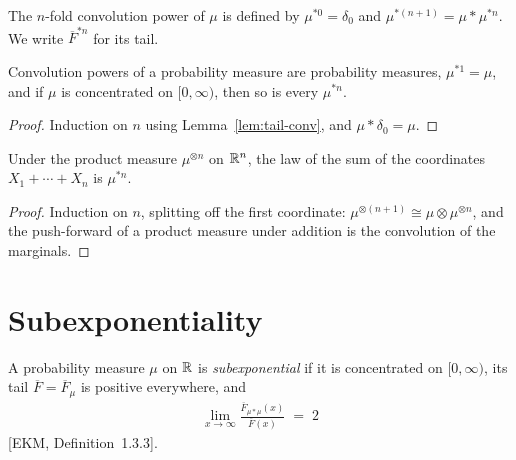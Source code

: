 \begin{definition}
  \label{def:convPow}
  \leanok
  The $n$-fold convolution power of $\mu$ is defined by $\mu^{*0} = \delta_0$ and
  $\mu^{*(n+1)} = \mu * \mu^{*n}$. We write $\overline{F}^{*n}$ for its tail.
\end{definition}

\begin{lemma}
  \label{lem:convPow-basic}
  \leanok
  Convolution powers of a probability measure are probability measures, $\mu^{*1} = \mu$, and
  if $\mu$ is concentrated on $[0, \infty)$, then so is every $\mu^{*n}$.
\end{lemma}
\begin{proof}
  \leanok
  Induction on $n$ using Lemma~\ref{lem:tail-conv}, and $\mu * \delta_0 = \mu$.
\end{proof}

\begin{lemma}
  \label{lem:map-pi-sum-convPow}
  \leanok
  Under the product measure $\mu^{\otimes n}$ on $\mathbb{R}^n$, the law of the sum of the
  coordinates $X_1 + \cdots + X_n$ is $\mu^{*n}$.
\end{lemma}
\begin{proof}
  \leanok
  Induction on $n$, splitting off the first coordinate: $\mu^{\otimes (n+1)} \cong \mu \otimes \mu^{\otimes n}$,
  and the push-forward of a product measure under addition is the convolution of the marginals.
\end{proof}


\section{Subexponentiality}

\begin{definition}
  \label{def:subexponential}
  \leanok
  A probability measure $\mu$ on $\mathbb{R}$ is \emph{subexponential} if it is concentrated on
  $[0, \infty)$, its tail $\overline{F} = \overline{F}_\mu$ is positive everywhere, and
  \begin{align*}
    \lim_{x \to \infty} \frac{\overline{F}_{\mu * \mu}(x)}{\overline{F}(x)} \; = \; 2
  \end{align*}
  [EKM, Definition~1.3.3].
\end{definition}

